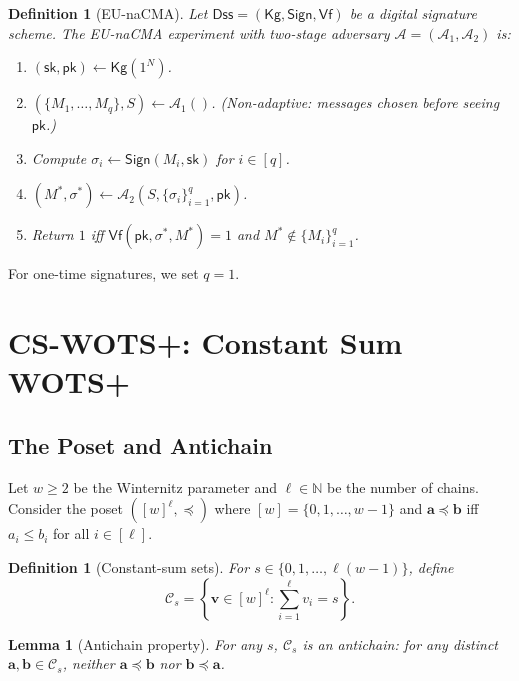 \documentclass[11pt,a4paper]{article}
\newtheorem{lemma}[theorem]{Lemma}
\newtheorem{definition}[theorem]{Definition}
\newcommand{\pk}{\mathsf{pk}}
\newcommand{\sk}{\mathsf{sk}}
\newcommand{\cC}{\mathcal{C}}
\newcommand{\Nbits}{N}
\begin{document}
\begin{definition}[EU-naCMA]
Let $\mathsf{Dss}=(\mathsf{Kg},\mathsf{Sign},\mathsf{Vf})$ be a digital signature scheme. The EU-naCMA experiment with two-stage adversary $\mathcal{A}=(\mathcal{A}_1,\mathcal{A}_2)$ is:
\begin{enumerate}
    \item $(\sk,\pk) \gets \mathsf{Kg}(1^\Nbits)$.
    \item $(\{M_1,\ldots,M_q\}, S) \gets \mathcal{A}_1()$. (Non-adaptive: messages chosen before seeing $\pk$.)
    \item Compute $\sigma_i \gets \mathsf{Sign}(M_i,\sk)$ for $i \in [q]$.
    \item $(M^*,\sigma^*) \gets \mathcal{A}_2(S, \{\sigma_i\}_{i=1}^q, \pk)$.
    \item Return $1$ iff $\mathsf{Vf}(\pk, \sigma^*, M^*) = 1$ and $M^* \notin \{M_i\}_{i=1}^q$.
\end{enumerate}
\end{definition}

For one-time signatures, we set $q=1$.

\section{CS-WOTS+: Constant Sum WOTS+}
\label{sec:cswots}

\subsection{The Poset and Antichain}

Let $w \ge 2$ be the Winternitz parameter and $\ell \in \mathbb{N}$ be the number of chains. Consider the poset $([w]^\ell, \preceq)$ where $[w] = \{0,1,\ldots,w-1\}$ and $\mathbf{a} \preceq \mathbf{b}$ iff $a_i \le b_i$ for all $i \in [\ell]$.

\begin{definition}[Constant-sum sets]
For $s \in \{0,1,\ldots,\ell(w-1)\}$, define
\[
\cC_s = \left\{\mathbf{v} \in [w]^\ell : \sum_{i=1}^\ell v_i = s\right\}.
\]
\end{definition}

\begin{lemma}[Antichain property]
\label{lem:antichain}
For any $s$, $\cC_s$ is an antichain: for any distinct $\mathbf{a},\mathbf{b} \in \cC_s$, neither $\mathbf{a} \preceq \mathbf{b}$ nor $\mathbf{b} \preceq \mathbf{a}$.
\end{lemma}
\end{document}
